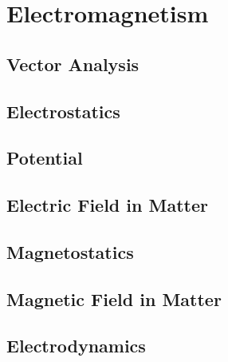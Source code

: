 \documentclass[10pt]{report}
\begin{document}
\pagestyle{empty}
\nocite{King2009}
\nocite{Boas2005}
\nocite{Griffiths2017}
\nocite{Serway2014}
\nocite{Serway2019}


\chapter*{Electromagnetism}
\section*{Vector Analysis}
\clearpage

\section*{Electrostatics}
\clearpage
\clearpage

\section*{Potential}
\clearpage
\clearpage

\section*{Electric Field in Matter}
\clearpage

\section*{Magnetostatics}
\clearpage
\clearpage

\section*{Magnetic Field in Matter}
\clearpage

\section*{Electrodynamics}
\clearpage
\clearpage
\end{document}
